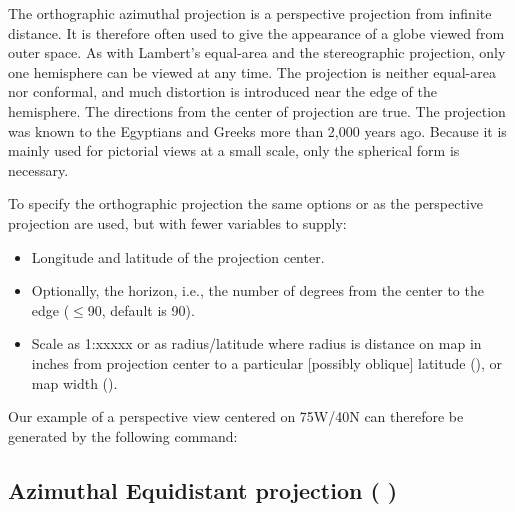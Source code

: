 
The orthographic azimuthal projection is a perspective projection
from infinite distance.  It is therefore often used to give the
appearance of a globe viewed from outer space.  As with Lambert's
equal-area and the stereographic projection, only one hemisphere
can be viewed at any time.  The projection is neither equal-area
nor conformal, and much distortion is introduced near the edge
of the hemisphere.  The directions from the center of projection
are true.  The projection was known to the Egyptians and Greeks
more than 2,000 years ago.  Because it is mainly used for
pictorial views at a small scale, only the spherical form is necessary.

To specify the orthographic projection the same options  or  as the perspective
projection are used, but with fewer variables to supply:

\begin{itemize}
\item Longitude and latitude of the projection center.
\item Optionally, the horizon, i.e., the number of degrees from the center to the edge ($\le$90\DS, default is 90\DS).
\item Scale as 1:xxxxx or as radius/latitude where
radius is distance on map in inches from projection center to
a particular [possibly oblique] latitude (), or map
width ().
\end{itemize}

Our example of a perspective view centered on 75\DS W/40\DS N
can therefore be generated by the following  command: 




\subsection {Azimuthal Equidistant projection ( )}


